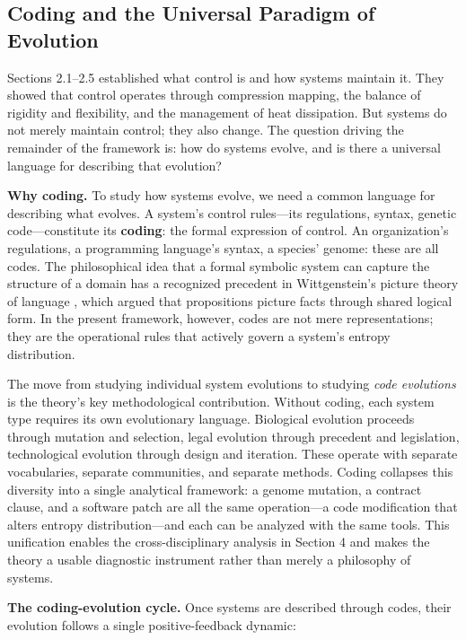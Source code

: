 \documentclass[11pt,a4paper]{article}
\begin{document}
\subsection{Coding and the Universal Paradigm of Evolution}

Sections 2.1--2.5 established what control is and how systems maintain it. They showed that control operates through compression mapping, the balance of rigidity and flexibility, and the management of heat dissipation. But systems do not merely maintain control; they also change. The question driving the remainder of the framework is: how do systems evolve, and is there a universal language for describing that evolution?

\textbf{Why coding.} To study how systems evolve, we need a common language for describing what evolves. A system's control rules---its regulations, syntax, genetic code---constitute its \textbf{coding}: the formal expression of control. An organization's regulations, a programming language's syntax, a species' genome: these are all codes. The philosophical idea that a formal symbolic system can capture the structure of a domain has a recognized precedent in Wittgenstein's picture theory of language \citep{wittgenstein1922}, which argued that propositions picture facts through shared logical form. In the present framework, however, codes are not mere representations; they are the operational rules that actively govern a system's entropy distribution.

The move from studying individual system evolutions to studying \textit{code evolutions} is the theory's key methodological contribution. Without coding, each system type requires its own evolutionary language. Biological evolution proceeds through mutation and selection, legal evolution through precedent and legislation, technological evolution through design and iteration. These operate with separate vocabularies, separate communities, and separate methods. Coding collapses this diversity into a single analytical framework: a genome mutation, a contract clause, and a software patch are all the same operation---a code modification that alters entropy distribution---and each can be analyzed with the same tools. This unification enables the cross-disciplinary analysis in Section 4 and makes the theory a usable diagnostic instrument rather than merely a philosophy of systems.

\textbf{The coding-evolution cycle.} Once systems are described through codes, their evolution follows a single positive-feedback dynamic:
\end{document}
